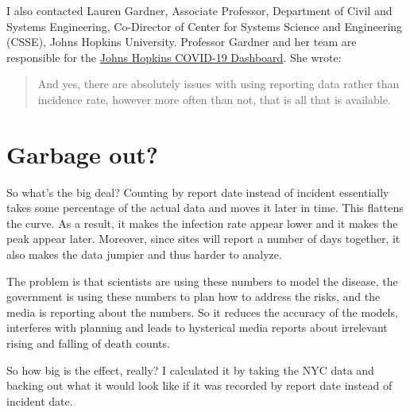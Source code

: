\documentclass[10pt,reqno]{amsart}
\begin{document}
I also contacted Lauren Gardner, Associate Professor, Department of
Civil and Systems Engineering, Co-Director of Center for Systems
Science and Engineering (CSSE), Johns Hopkins University.  Professor
Gardner and her team are responsible for the
\href{https://coronavirus.jhu.edu/map.html}{Johns Hopkins COVID-19
  Dashboard}.  She wrote:

\begin{quotation}
  And yes, there are absolutely issues with using reporting data
  rather than incidence rate, however more often than not, that is all
  that is available.
\end{quotation}

\section{Garbage out?}

So what's the big deal?  Counting by report date instead of incident
essentially takes some percentage of the actual data and moves it
later in time.  This flattens the curve.  As a result, it makes the
infection rate appear lower and it makes the peak appear later.
Moreover, since sites will report a number of days together, it also
makes the data jumpier and thus harder to analyze.

The problem is that scientists are using these numbers to model the
disease, the government is using these numbers to plan
how to address the risks, and the media is reporting about the
numbers.  So it reduces the accuracy of the models, interferes with
planning and leads to hysterical media reports about irrelevant rising
and falling of death counts.

So how big is the effect, really?  I calculated it by taking the NYC
data and backing out what it would look like if it was recorded by
report date instead of incident date.

\printbibliography
\end{document}

